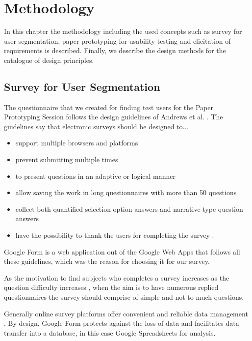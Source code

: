 \chapter{Methodology}

In this chapter the methodology including the used concepts such as survey for user segmentation, paper prototyping for usability testing and elicitation of requirements is described. Finally, we describe the design methods for the catalogue of design principles.

\section{Survey for User Segmentation}

The questionnaire that we created for finding test users for the Paper Prototyping Session follows the design guidelines of Andrews et al. \cite{andrews2007conducting}. The guidelines say that electronic surveys should be designed to...

\begin{itemize}
	\item support multiple browsers and platforms \cite{yun2000comparative}
	\item prevent submitting multiple times \cite{yun2000comparative}
	\item to present questions in an adaptive or logical manner \cite{kehoe1997eighth}
	\item allow saving the work in long questionnaires with more than 50 questions \cite{smith1997casting}
	\item collect both quantified selection option answers and narrative type question answers \cite{yun2000comparative}
	\item have the possibility to thank the users for completing the survey \cite{smith1997casting}.
\end{itemize}

Google Form is a web application out of the Google Web Apps that follows all these guidelines, which was the reason for choosing it for our survey.

As the motivation to find subjects who completes a survey increases as the question difficulty increases \cite{andrews2007conducting}, when the aim is to have numerous replied questionnaires the survey should comprise of simple and not to much questions.

Generally online survey platforms offer convenient and reliable data management \cite{carbonaro2000design}. By design, Google Form protects against the loss of data and facilitates data transfer into a database, in this case Google Spreadsheets for analysis.

